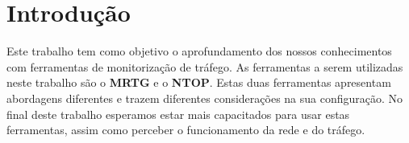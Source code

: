 \chapter{Introdução}

Este trabalho tem como objetivo o aprofundamento dos nossos conhecimentos com ferramentas de monitorização de tráfego.
As ferramentas a serem utilizadas neste trabalho são o \textbf{MRTG} e o \textbf{NTOP}.
Estas duas ferramentas apresentam abordagens diferentes e trazem diferentes considerações na sua configuração.
No final deste trabalho esperamos estar mais capacitados para usar estas ferramentas, assim como perceber o funcionamento da rede e do tráfego.